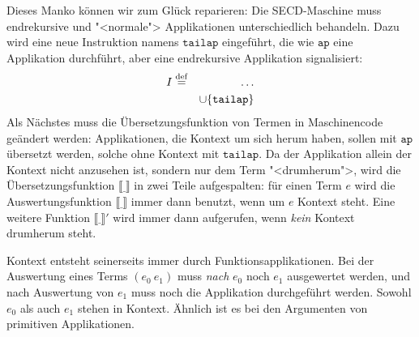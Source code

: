 %
Dieses Manko können wir zum Glück reparieren: Die
SECD-Maschine muss endrekursive und "<normale"> Applikationen
unterschiedlich behandeln.  Dazu wird eine neue Instruktion namens
$\mathtt{tailap}$ eingeführt, die wie $\mathtt{ap}$ eine Applikation
durchführt, aber eine endrekursive Applikation signalisiert:
%
\begin{eqnarray*}
  I &\stackrel{\rm def}{=}& \ldots\\
  &&\cup \{ \mathtt{tailap} \}
\end{eqnarray*}
%
Als Nächstes muss die Übersetzungsfunktion von Termen in Maschinencode
geändert werden:  Applikationen, die Kontext um sich herum haben,
sollen mit $\mathtt{ap}$ übersetzt werden, solche ohne Kontext mit
$\mathtt{tailap}$.  Da der Applikation allein der Kontext nicht
anzusehen ist, sondern nur dem Term "<drumherum">, wird die
Übersetzungsfunktion $\llbracket \underline{~} \rrbracket$ in zwei
Teile aufgespalten: für einen Term $e$ wird die Auswertungsfunktion $\llbracket\underline{~}\rrbracket$ immer dann benutzt, wenn um $e$ Kontext steht.  Eine
weitere Funktion $\llbracket \underline{~} \rrbracket'$ wird immer
dann aufgerufen, wenn \emph{kein} Kontext drumherum steht.

Kontext entsteht seinerseits immer durch Funktionsapplikationen.  Bei
der Auswertung eines Terms $(e_0~e_1)$ muss \emph{nach} $e_0$ noch
$e_1$ ausgewertet werden, und nach Auswertung von $e_1$ muss noch die
Applikation durchgeführt werden.  Sowohl $e_0$ als auch $e_1$ stehen
in Kontext.  Ähnlich ist es bei den Argumenten von primitiven
Applikationen.

